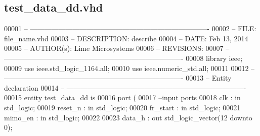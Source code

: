 \subsection{test\+\_\+data\+\_\+dd.\+vhd}
\label{testing_2test__data__dd_8vhd_source}

\begin{DoxyCode}
00001 \textcolor{keyword}{-- ---------------------------------------------------------------------------- }
00002 \textcolor{keyword}{-- FILE:    file\_name.vhd}
00003 \textcolor{keyword}{-- DESCRIPTION: describe}
00004 \textcolor{keyword}{-- DATE:    Feb 13, 2014}
00005 \textcolor{keyword}{-- AUTHOR(s):   Lime Microsystems}
00006 \textcolor{keyword}{-- REVISIONS:}
00007 \textcolor{keyword}{-- ---------------------------------------------------------------------------- }
00008 \textcolor{vhdlkeyword}{library }\textcolor{keywordflow}{ieee};
00009 \textcolor{vhdlkeyword}{use }ieee.std\_logic\_1164.\textcolor{keywordflow}{all};
00010 \textcolor{vhdlkeyword}{use }ieee.numeric\_std.\textcolor{keywordflow}{all};
00011 
00012 \textcolor{keyword}{-- ----------------------------------------------------------------------------}
00013 \textcolor{keyword}{-- Entity declaration}
00014 \textcolor{keyword}{-- ----------------------------------------------------------------------------}
00015 \textcolor{keywordflow}{entity }test_data_dd \textcolor{keywordflow}{is}
00016   \textcolor{keywordflow}{port} \textcolor{vhdlchar}{(}
00017 \textcolor{keyword}{        --input ports }
00018         \textcolor{vhdlchar}{clk}       \textcolor{vhdlchar}{:} \textcolor{keywordflow}{in} \textcolor{comment}{std\_logic};
00019         \textcolor{vhdlchar}{reset_n}   \textcolor{vhdlchar}{:} \textcolor{keywordflow}{in} \textcolor{comment}{std\_logic};
00020             \textcolor{vhdlchar}{fr_start}     \textcolor{vhdlchar}{:} \textcolor{keywordflow}{in} \textcolor{comment}{std\_logic};
00021             \textcolor{vhdlchar}{mimo_en}   \textcolor{vhdlchar}{:} \textcolor{keywordflow}{in} \textcolor{comment}{std\_logic};
00022           
00023             \textcolor{vhdlchar}{data_h}        \textcolor{vhdlchar}{:} \textcolor{keywordflow}{out} \textcolor{comment}{std\_logic\_vector}\textcolor{vhdlchar}{(}\textcolor{vhdllogic}{}\textcolor{vhdllogic}{12} \textcolor{keywordflow}{downto} \textcolor{vhdllogic}{}\textcolor{vhdllogic}{0}\textcolor{vhdlchar}{)};

\end{DoxyCode}
